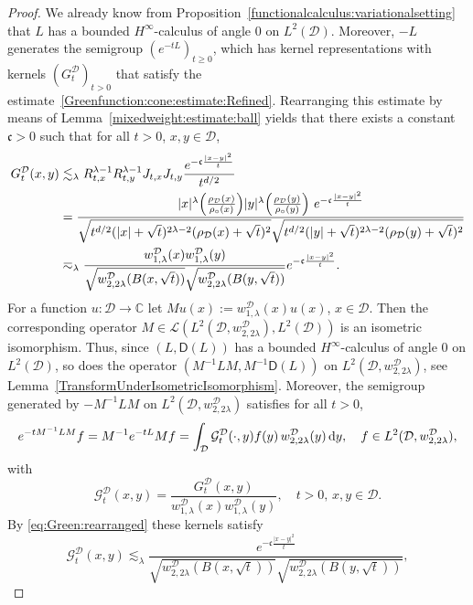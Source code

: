 \documentclass[12pt,a4paper, reqno]{amsart}
\theoremstyle{plain}
\theoremstyle{definition}
\theoremstyle{remark}
\numberwithin{equation}{section}
\newcommand{\1}{\mathbbm{1}}
\newcommand{\dd}{\textup{d}}
\newcommand{\C}{\ensuremath{\mathbb{C}}}
\newcommand{\calG}{\ensuremath{\mathcal{G}}}
\newcommand{\calD}{\ensuremath{\mathcal{D}}}
\newcommand{\sL}{\ensuremath{\mathscr{L}}}
\newcommand{\sfD}{\ensuremath{\mathsf{D}}}
\begin{document}
\begin{proof}
 
    We already know from Proposition~\ref{functionalcalculus:variationalsetting} that $L$ has a bounded $H^\infty$-calculus of angle $0$ on $L^2(\calD)$. 
    Moreover, $-L$ generates the semigroup $(e^{-tL})_{t\geq0}$, which has kernel representations with kernels $(G_t^\calD)_{t>0}$ that satisfy the estimate~\eqref{Greenfunction:cone:estimate:Refined}. Rearranging this estimate by means of  Lemma~\ref{mixedweight:estimate:ball} yields that there exists a constant $\mathfrak{c} >0$ such that for all $t> 0$, $x,y\in \calD$, 
  \begin{align}\label{eq:Green:rearranged}
 	G^\calD_t(x,y)
    &\lesssim_{\lambda} R_{t,x}^{\lambda-1}R_{t,y}^{\lambda-1} J_{t,x}J_{t,y} \frac{e^{-\mathfrak{c}\frac{|x-y|^2}{t}}}{t^{d/2}}\notag\\
    &= \frac{|x|^\lambda \Big(\frac{\rho_\calD(x)}{\rho_\circ(x)}\Big)  |y|^\lambda \Big(\frac{\rho_\calD(y)}{\rho_\circ(y)}\Big) \,\, e^{-\mathfrak{c}\frac{|x-y|^2}{t}}}{\sqrt{t^{d/2}(|x|+\sqrt{t})^{2\lambda-2}(\rho_\calD(x)+\sqrt{t})^2}\sqrt{t^{d/2}(|y|+\sqrt{t})^{2\lambda-2}(\rho_\calD(y)+\sqrt{t})^2}}\notag\\
    &\eqsim_{\lambda} \frac{w^\calD_{1,\lambda}(x)w^\calD_{1,\lambda}(y)}{\sqrt{ w_{2,2\lambda}^\calD(B(x,\sqrt{t}))}  \sqrt{ w_{2,2\lambda}^\calD(B(y,\sqrt{t}))}} e^{-\mathfrak{c}\frac{|x-y|^2}{t}}.    
 \end{align}
For a function $u\colon \calD\rightarrow\C$ let $M u(x):= w^\calD_{1,\lambda}(x) u(x)$, $x\in\calD$. 
Then
the corresponding operator $M \in \sL(L^2(\calD,  w_{2,2\lambda}^\calD),L^2(\calD))$ is an isometric isomorphism. 
Thus, since $(L,\sfD(L))$ has a bounded $H^\infty$-calculus of angle $0$ on $L^2(\calD)$, so does the operator $(M^{-1}L M,M^{-1}\sfD(L))$ on $L^2(\calD,w_{2,2\lambda}^\calD)$, see Lemma~\ref{TransformUnderIsometricIsomorphism}. Moreover, 
the semigroup generated by $-M^{-1}L M$ on $L^2(\calD,w_{2,2\lambda}^\calD)$ satisfies for all $t>0$,
\[
e^{-tM^{-1}LM}f
=
M^{-1}e^{-tL}Mf
=
\int_\calD \calG_t^\calD(\cdot,y)f(y)\,w_{2,2\lambda}^\calD(y)\,\dd y,\quad f\in L^2(\calD,w_{2,2\lambda}^\calD),
\]
with 
\[
\calG_t^\calD(x,y) =\frac{G_t^\calD(x,y)}{w_{1,\lambda}^{\calD}(x)w_{1,\lambda}^{\calD}(y)}  ,\quad t>0,\, x,y\in\calD.
\]
By \eqref{eq:Green:rearranged} these kernels satisfy
\[
\calG^\calD_t(x,y)
\lesssim_{\lambda} 
\frac{e^{-\mathfrak{c}\frac{|x-y|^2}{t}}}{\sqrt{w_{2,2\lambda}^\calD(B(x,\sqrt{t}))}  \sqrt{w_{2,2\lambda}^\calD(B(y,\sqrt{t}))}},   
\]

\end{proof}
\end{document}
